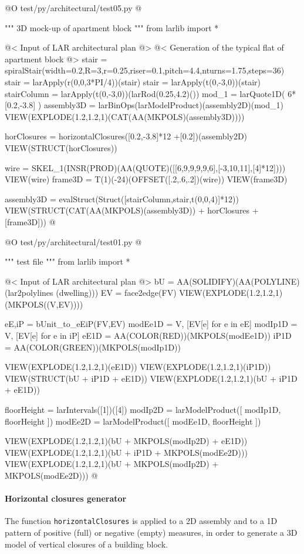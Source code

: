 \documentclass[11pt,oneside]{article}    %
\begin{document}
@O test/py/architectural/test05.py
@{""" 3D mock-up of apartment block """
from larlib import *

@< Input of LAR architectural plan @>
@< Generation of the typical flat of apartment block @>
stair = spiralStair(width=0.2,R=3,r=0.25,riser=0.1,pitch=4.4,nturns=1.75,steps=36)
stair = larApply(r(0,0,3*PI/4))(stair)
stair = larApply(t(0,-3,0))(stair)
stairColumn = larApply(t(0,-3,0))(larRod(0.25,4.2)())
mod_1 = larQuote1D( 6*[0.2,-3.8] )
assembly3D = larBinOps(larModelProduct)(assembly2D)(mod_1)
VIEW(EXPLODE(1.2,1.2,1)(CAT(AA(MKPOLS)(assembly3D))))

horClosures = horizontalClosures([0.2,-3.8]*12 +[0.2])(assembly2D)
VIEW(STRUCT(horClosures))

wire = SKEL_1(INSR(PROD)(AA(QUOTE)([[6,9,9,9,9,6],[-3,10,11],[4]*12])))
VIEW(wire)
frame3D = T(1)(-24)(OFFSET([.2,.6,.2])(wire))
VIEW(frame3D)

assembly3D = evalStruct(Struct([stairColumn,stair,t(0,0,4)]*12))
VIEW(STRUCT(CAT(AA(MKPOLS)(assembly3D)) + horClosures + [frame3D]))
@}


@O test/py/architectural/test01.py
@{""" test file """
from larlib import *

@< Input of LAR architectural plan @>
bU = AA(SOLIDIFY)(AA(POLYLINE)(lar2polylines (dwelling)))
EV = face2edge(FV)
VIEW(EXPLODE(1.2,1.2,1)(MKPOLS((V,EV))))

eE,iP = bUnit_to_eEiP(FV,EV)
modEe1D = V, [EV[e] for e in eE]
modIp1D = V, [EV[e] for e in iP]
eE1D = AA(COLOR(RED))(MKPOLS(modEe1D))
iP1D = AA(COLOR(GREEN))(MKPOLS(modIp1D))

VIEW(EXPLODE(1.2,1.2,1)(eE1D))
VIEW(EXPLODE(1.2,1.2,1)(iP1D))
VIEW(STRUCT(bU + iP1D + eE1D))
VIEW(EXPLODE(1.2,1.2,1)(bU + iP1D + eE1D))

floorHeight = larIntervals([1])([4])
modIp2D = larModelProduct([ modIp1D, floorHeight ])
modEe2D = larModelProduct([ modEe1D, floorHeight ])

VIEW(EXPLODE(1.2,1.2,1)(bU + MKPOLS(modIp2D) + eE1D))
VIEW(EXPLODE(1.2,1.2,1)(bU + iP1D + MKPOLS(modEe2D)))
VIEW(EXPLODE(1.2,1.2,1)(bU + MKPOLS(modIp2D) + MKPOLS(modEe2D)))
@}


\paragraph{Horizontal closures generator}
The function \texttt{horizontalClosures} is applied to a 2D assembly and to a 1D pattern of positive (full) or negative (empty) measures, in order to generate a 3D model of vertical closures of a building block.
\end{document}
